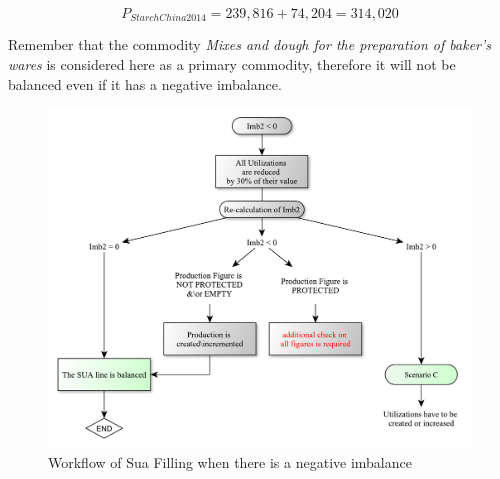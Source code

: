 \documentclass[]{article}
\begin{document}
\begin{equation}
\label{eq:prod}
P_{StarchChina2014} = 239,816 + 74,204 = 314,020
\end{equation}

Remember that the commodity \emph{Mixes and dough for the preparation of
baker's wares} is considered here as a primary commodity, therefore it
will not be balanced even if it has a negative imbalance.

\begin{figure}

{\centering \includegraphics{images/StandBal/06_NegativeImbalance} 

}

\caption{\label{fig:f5}Workflow of Sua Filling when there is a negative imbalance}\label{fig:f6}
\end{figure}
\end{document}
